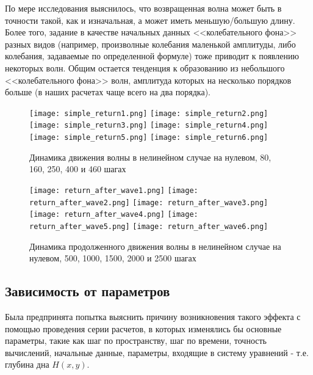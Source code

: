 По мере исследования выяснилось, что возвращенная волна может быть в точности такой, как и изначальная, а может иметь меньшую/большую длину. Более того, задание в качестве начальных данных <<колебательного фона>> разных видов (например, произволные колебания маленькой амплитуды, либо колебания, задаваемые по определенной формуле) тоже приводит к появлению некоторых волн. Общим остается тенденция к образованию из небольшого <<колебательного фона>> волн, амплитуда которых на несколько порядков больше (в наших расчетах чаще всего на два порядка).

\newpage
\begin{figure}[H]
    \centering
    \vspace{12em}
    \texttt{[image: simple\_return1.png]}
    \texttt{[image: simple\_return2.png]}
    \texttt{[image: simple\_return3.png]}
    \texttt{[image: simple\_return4.png]}
    \texttt{[image: simple\_return5.png]}
    \texttt{[image: simple\_return6.png]}
    \caption{Динамика движения волны в нелинейном случае на нулевом, 80, 160, 250, 400 и 460 шагах}
    \label{fig:ReturnWave}
\end{figure}

\newpage
\begin{figure}[H]
    \centering
    \vspace{12em}
    \texttt{[image: return\_after\_wave1.png]}
    \texttt{[image: return\_after\_wave2.png]}
    \texttt{[image: return\_after\_wave3.png]}
    \texttt{[image: return\_after\_wave4.png]}
    \texttt{[image: return\_after\_wave5.png]}
    \texttt{[image: return\_after\_wave6.png]}
    \caption{Динамика продолженного движения волны в нелинейном случае на нулевом, 500, 1000, 1500, 2000 и 2500 шагах}
    \label{fig:ReturnAfterWave}
\end{figure}

\newpage
\addtocounter{subsection}{1}
\subsection*{Зависимость от параметров}

Была предпринята попытка выяснить причину возникновения такого эффекта с помощью проведения серии расчетов, в которых изменялись бы основные параметры, такие как шаг по пространству, шаг по времени, точность вычислений, начальные данные, параметры, входящие в систему уравнений - т.е. глубина дна $H(x,y)$.

